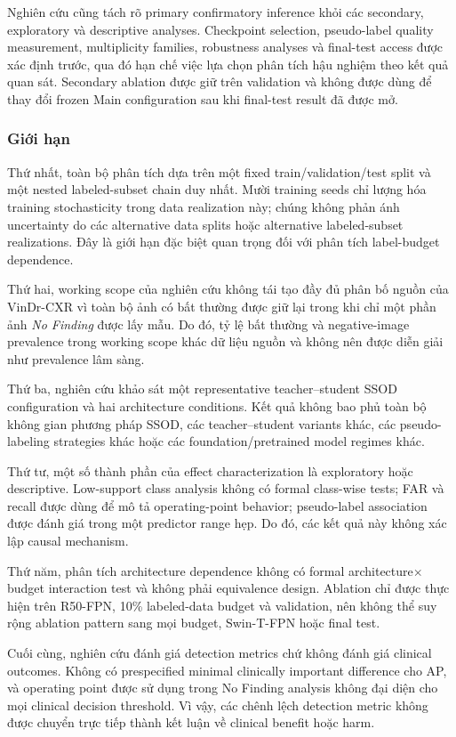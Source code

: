 \documentclass[pdflatex,sn-mathphys-num]{sn-jnl}%
\theoremstyle{thmstyleone}%
\theoremstyle{thmstyletwo}%
\theoremstyle{thmstylethree}%
\begin{document}
Nghiên cứu cũng tách rõ primary confirmatory inference khỏi các secondary, exploratory và descriptive analyses. Checkpoint selection, pseudo-label quality measurement, multiplicity families, robustness analyses và final-test access được xác định trước, qua đó hạn chế việc lựa chọn phân tích hậu nghiệm theo kết quả quan sát. Secondary ablation được giữ trên validation và không được dùng để thay đổi frozen Main configuration sau khi final-test result đã được mở.

\subsubsection{Giới hạn}

Thứ nhất, toàn bộ phân tích dựa trên một fixed train/validation/test split và một nested labeled-subset chain duy nhất. Mười training seeds chỉ lượng hóa training stochasticity trong data realization này; chúng không phản ánh uncertainty do các alternative data splits hoặc alternative labeled-subset realizations. Đây là giới hạn đặc biệt quan trọng đối với phân tích label-budget dependence.

Thứ hai, working scope của nghiên cứu không tái tạo đầy đủ phân bố nguồn của VinDr-CXR vì toàn bộ ảnh có bất thường được giữ lại trong khi chỉ một phần ảnh \textit{No Finding} được lấy mẫu. Do đó, tỷ lệ bất thường và negative-image prevalence trong working scope khác dữ liệu nguồn và không nên được diễn giải như prevalence lâm sàng.

Thứ ba, nghiên cứu khảo sát một representative teacher--student SSOD configuration và hai architecture conditions. Kết quả không bao phủ toàn bộ không gian phương pháp SSOD, các teacher--student variants khác, các pseudo-labeling strategies khác hoặc các foundation/pretrained model regimes khác.

Thứ tư, một số thành phần của effect characterization là exploratory hoặc descriptive. Low-support class analysis không có formal class-wise tests; FAR và recall được dùng để mô tả operating-point behavior; pseudo-label association được đánh giá trong một predictor range hẹp. Do đó, các kết quả này không xác lập causal mechanism.

Thứ năm, phân tích architecture dependence không có formal architecture$\times$budget interaction test và không phải equivalence design. Ablation chỉ được thực hiện trên R50-FPN, 10\% labeled-data budget và validation, nên không thể suy rộng ablation pattern sang mọi budget, Swin-T-FPN hoặc final test.

Cuối cùng, nghiên cứu đánh giá detection metrics chứ không đánh giá clinical outcomes. Không có prespecified minimal clinically important difference cho AP, và operating point được sử dụng trong No Finding analysis không đại diện cho mọi clinical decision threshold. Vì vậy, các chênh lệch detection metric không được chuyển trực tiếp thành kết luận về clinical benefit hoặc harm.
\end{document}
